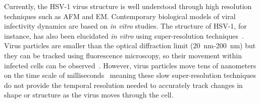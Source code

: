 Currently, the \gls{HSV}-1 virus structure is well understood through high resolution techniques such as \gls{AFM} and \gls{EM}.
Contemporary biological models of viral infectivity dynamics are based on \textit{in vitro} studies. %
The structure of \gls{HSV}-1, for instance, has also been elucidated \textit{in vitro} using super-resolution techniques~\cite{laine_structural_2015}.
Virus particles are smaller than the optical diffraction limit (\SI{20}{\nano\meter}-\SI{200}{\nano\meter})
but they can be tracked using fluorescence microscopy, so their movement within infected cells can be observed~\cite{pereira_hiv_2012}.
However, virus particles move tens of nanometers on the time scale of milliseconds~\cite{brandenburg_virus_2007} meaning these slow super-resolution techniques do not provide the temporal resolution needed to accurately track changes in shape or structure as the virus moves through the cell.

%

